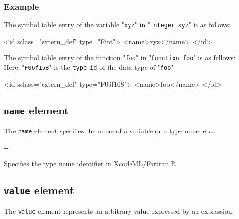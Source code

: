 \subsubsection*{Example}

The symbol table entry of the variable "{\tt xyz}" in "{\tt integer xyz}" is as follows:
\vspace{2mm}

\begin{XcodeMLFExample}
<id sclass="extern_def" type="Fint">
  <name>xyz</name>
</id>
\end{XcodeMLFExample}

The symbol table entry of the function "{\tt foo}" in "{\tt function foo}" is as follows:
Here, "{\tt F06f168}" is the {\tt type\_id} of the data type of "{\tt foo}".
\vspace{2mm}

\begin{XcodeMLFExample}
<id sclass="extern_def" type="F06f168">
  <name>foo</name>
</id>
\end{XcodeMLFExample}


\subsection{ {\tt name} element}

The {\tt name} element specifies the name of a variable or a type name etc..


\begin{XcodeMLChildElements}
\XcodeMLElementDef{-}
{-}{-}
\end{XcodeMLChildElements}

\begin{XcodeMLAttributes}
{Specifies the type name identifier in XcodeML/Fortran.}{R}
\end{XcodeMLAttributes}


\subsection{ {\tt value} element}

The {\tt value} element represents an arbitrary value expressed by an expression.


